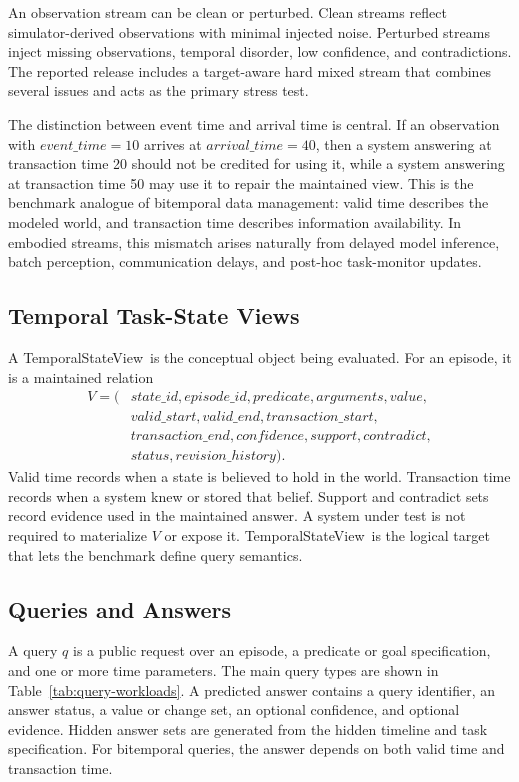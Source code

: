 \documentclass[conference]{IEEEtran}
\newcommand{\tsv}{TemporalStateView}
\begin{document}
An observation stream can be clean or perturbed. Clean streams reflect simulator-derived observations with minimal injected noise. Perturbed streams inject missing observations, temporal disorder, low confidence, and contradictions. The reported release includes a target-aware hard mixed stream that combines several issues and acts as the primary stress test.

The distinction between event time and arrival time is central. If an observation with $event\_time=10$ arrives at $arrival\_time=40$, then a system answering at transaction time 20 should not be credited for using it, while a system answering at transaction time 50 may use it to repair the maintained view. This is the benchmark analogue of bitemporal data management: valid time describes the modeled world, and transaction time describes information availability. In embodied streams, this mismatch arises naturally from delayed model inference, batch perception, communication delays, and post-hoc task-monitor updates.

\subsection{Temporal Task-State Views}

A \tsv\ is the conceptual object being evaluated. For an episode, it is a maintained relation
\begin{equation}
\begin{split}
V = (&state\_id, episode\_id, predicate, arguments, value,\\
     &valid\_start, valid\_end, transaction\_start,\\
     &transaction\_end, confidence, support, contradict,\\
     &status, revision\_history).
\end{split}
\end{equation}
Valid time records when a state is believed to hold in the world. Transaction time records when a system knew or stored that belief. Support and contradict sets record evidence used in the maintained answer. A system under test is not required to materialize $V$ or expose it. \tsv\ is the logical target that lets the benchmark define query semantics.

\subsection{Queries and Answers}

A query $q$ is a public request over an episode, a predicate or goal specification, and one or more time parameters. The main query types are shown in Table~\ref{tab:query-workloads}. A predicted answer contains a query identifier, an answer status, a value or change set, an optional confidence, and optional evidence. Hidden answer sets are generated from the hidden timeline and task specification. For bitemporal queries, the answer depends on both valid time and transaction time.
\end{document}
